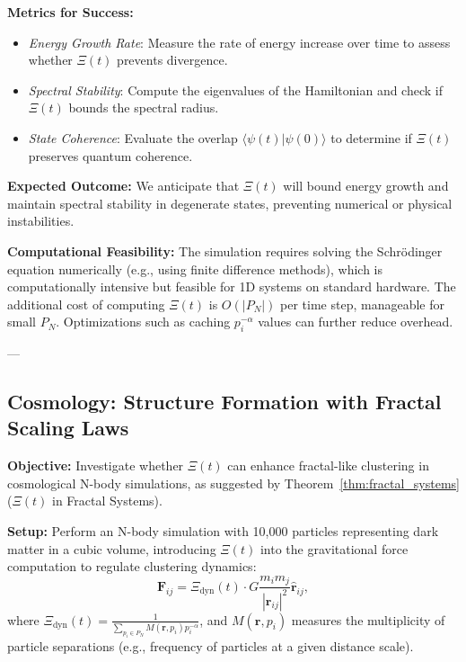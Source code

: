 \documentclass{article}
\theoremstyle{plain}
\begin{document}
\textbf{Metrics for Success:}
\begin{itemize}
    \item \textit{Energy Growth Rate}: Measure the rate of energy increase over time to assess whether \(\Xi(t) \) prevents divergence.
    \item \textit{Spectral Stability}: Compute the eigenvalues of the Hamiltonian and check if \(\Xi(t) \) bounds the spectral radius.
    \item \textit{State Coherence}: Evaluate the overlap \( \langle \psi(t) | \psi(0) \rangle \) to determine if \(\Xi(t) \) preserves quantum coherence.
\end{itemize}

\textbf{Expected Outcome:} We anticipate that \(\Xi(t) \) will bound energy growth and maintain spectral stability in degenerate states, preventing numerical or physical instabilities.

\textbf{Computational Feasibility:} The simulation requires solving the Schrödinger equation numerically (e.g., using finite difference methods), which is computationally intensive but feasible for 1D systems on standard hardware. The additional cost of computing \(\Xi(t) \) is \( O(|P_N|) \) per time step, manageable for small \( P_N \). Optimizations such as caching \( p_i^{-\alpha} \) values can further reduce overhead.

---

\subsection{Cosmology: Structure Formation with Fractal Scaling Laws}
\label{subsec:cosmology_test}

\textbf{Objective:} Investigate whether \(\Xi(t) \) can enhance fractal-like clustering in cosmological N-body simulations, as suggested by Theorem~\ref{thm:fractal_systems} (\(\Xi(t) \) in Fractal Systems).

\textbf{Setup:} Perform an N-body simulation with 10,000 particles representing dark matter in a cubic volume, introducing \(\Xi(t) \) into the gravitational force computation to regulate clustering dynamics:
\[
\mathbf{F}_{ij} = \Xi_{\text{dyn}}(t) \cdot G \frac{m_i m_j}{|\mathbf{r}_{ij}|^2} \hat{\mathbf{r}}_{ij},
\]
where \( \Xi_{\text{dyn}}(t) = \frac{1}{\sum_{p_i \in P_N} M(\mathbf{r}, p_i) p_i^{-\alpha}} \), and \( M(\mathbf{r}, p_i) \) measures the multiplicity of particle separations (e.g., frequency of particles at a given distance scale).
\end{document}
